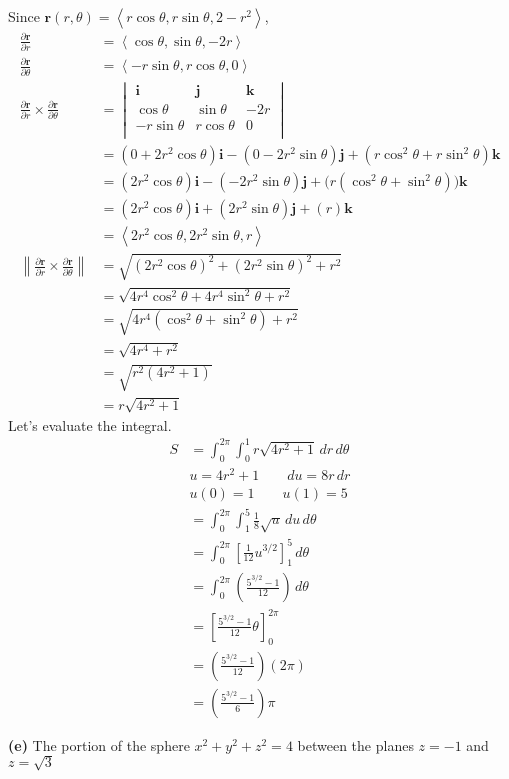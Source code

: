 \documentclass{article}
\newcommand{\lrp}[1]{\left( #1 \right)}
\newcommand{\lra}[1]{\left\langle #1 \right\rangle}
\newcommand{\lrb}[1]{\left[ #1 \right]}
\newcommand{\norm}[1]{\left\lVert #1 \right\rVert}
\renewcommand{\i}[0]{\mathbf{i}}
\renewcommand{\j}[0]{\mathbf{j}}
\renewcommand{\k}[0]{\mathbf{k}}
\renewcommand{\r}[0]{\mathbf{r}}
\begin{document}
Since $\displaystyle \r(r,\theta)=\lra{r\cos\theta, r\sin\theta, 2-r^2}$,
\begin{align*}
    \frac{\partial \r}{\partial r}&=\lra{\cos\theta,\sin\theta,-2r}\\
    \frac{\partial \r}{\partial \theta}&=\lra{-r\sin\theta, r\cos\theta, 0}\\
    \frac{\partial \r}{\partial r}\times \frac{\partial \r}{\partial \theta}&=\begin{vmatrix}
\mathbf{i} & \mathbf{j} & \mathbf{k}\\
\cos\theta & \sin\theta & -2r\\
-r\sin\theta & r\cos\theta & 0\\
\end{vmatrix}\\
&=\lrp{0+2r^2\cos\theta}\i -\lrp{0-2r^2\sin\theta}\j+\lrp{r\cos^2\theta+r\sin^2\theta}\k\\
&=\lrp{2r^2\cos\theta}\i-\lrp{-2r^2\sin\theta}\j +\Big(r\lrp{\cos^2\theta+\sin^2\theta}\Big)\k\\
&=\lrp{2r^2\cos\theta}\i+\lrp{2r^2\sin\theta}\j+\lrp{r}\k\tag{$\cos^2\theta+\sin^2\theta=1$}\\
&=\lra{2r^2\cos\theta,2r^2\sin\theta,r}\\
\norm{\frac{\partial \r}{\partial r}\times \frac{\partial \r}{\partial \theta}}&=\sqrt{\lrp{2r^2\cos\theta}^2+\lrp{2r^2\sin\theta}^2+r^2}\\
&=\sqrt{4r^4\cos^2\theta+4r^4\sin^2\theta+r^2}\\
&=\sqrt{4r^4\lrp{\cos^2\theta+\sin^2\theta}+r^2}\\
&=\sqrt{4r^4+r^2}\tag{$\cos^2\theta+\sin^2\theta=1$}\\
&=\sqrt{r^2(4r^2+1)}\\
&=r\sqrt{4r^2+1}\tag{$r\geq 0$ is always true}
\end{align*}
Let's evaluate the integral.
\begin{align*}
    S&=\int_0^{2\pi}\int_0^1 r\sqrt{4r^2+1}\,dr\,d\theta\\
    &u=4r^2+1\hspace{2em}du=8r\,dr\\
    &u(0)=1\hspace{2em}u(1)=5\\
    &=\int_0^{2\pi}\int_1^5 \frac{1}{8}\sqrt{u}\,du\,d\theta\\
    &=\int_0^{2\pi}\lrb{\frac{1}{12}u^{3/2}}_1^5\,d\theta\\
    &=\int_0^{2\pi}\lrp{\frac{5^{3/2}-1}{12}}\,d\theta\\
    &=\lrb{\frac{5^{3/2}-1}{12}\theta}_0^{2\pi}\\
    &=\lrp{\frac{5^{3/2}-1}{12}}\lrp{2\pi}\\
    &=\boxed{\lrp{\frac{5^{3/2}-1}{6}}\pi}
\end{align*}
{}\textbf{(e)} The portion of the sphere $x^2+y^2+z^2=4$ between the planes $z=-1$ and $z=\sqrt{3}$
\end{document}
